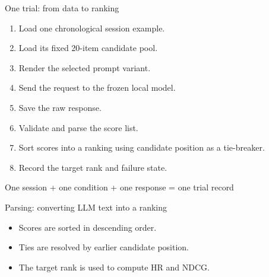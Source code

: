\documentclass[aspectratio=169,12pt]{beamer}
\begin{document}
\begin{frame}{One trial: from data to ranking}
\begin{enumerate}
  \item Load one chronological session example.
  \item Load its fixed 20-item candidate pool.
  \item Render the selected prompt variant.
  \item Send the request to the frozen local model.
  \item Save the raw response.
  \item Validate and parse the score list.
  \item Sort scores into a ranking using candidate position as a tie-breaker.
  \item Record the target rank and failure state.
\end{enumerate}

\vspace{0.5em}
\centering
\textcolor{DeepBlue}{One session + one condition + one response = one trial record}
\end{frame}

\begin{frame}{Parsing: converting LLM text into a ranking}
\begin{center}
\end{center}

\begin{itemize}
  \item Scores are sorted in descending order.
  \item Ties are resolved by earlier candidate position.
  \item The target rank is used to compute HR and NDCG.
\end{itemize}
\end{frame}
\end{document}
